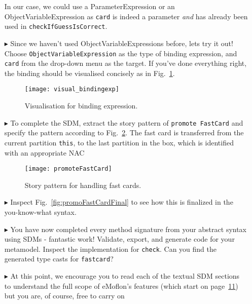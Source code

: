 \begin{itemize}
In our case, we could use a ParameterExpression or an ObjectVariableExpression as \texttt{card} is indeed a parameter \emph{and} has already been used in
\texttt{checkIfGuessIsCorrect}. 

\item[$\blacktriangleright$] Since we haven't used ObjectVariableExpressions before, lets try it out! Choose \texttt{ObjectVariableExpression} as the type of
binding expression, and \texttt{card} from the drop-down menu as the target. If you've done everything right, the binding should be visualised concisely as in
Fig.~\ref{fig:sdm_fastcard_4}.
 
\begin{figure}[htbp]
\begin{center}
  \texttt{[image: visual\_bindingexp]}
  \caption{Visualisation for binding expression.}  
  \label{fig:sdm_fastcard_4}
\end{center}
\end{figure}

\item[$\blacktriangleright$] To complete the SDM, extract the story pattern of \texttt{promote FastCard} and specify the pattern according to
Fig.~\ref{fig:sdm_fastcard_5}.
The fast card is transferred from the current partition \texttt{this}, to the last partition in the box, which is identified with an appropriate \mbox{NAC}

\begin{figure}[htbp]
\begin{center}
  \texttt{[image: promoteFastCard]}
  \caption{Story pattern for handling fast cards.}  
  \label{fig:sdm_fastcard_5}
\end{center}
\end{figure}

\item[$\blacktriangleright$] Inspect Fig.~\ref{fig:promoFastCardFinal} to see how this is finalized in the you-know-what syntax.

\item[$\blacktriangleright$] You have now completed every method signature from your abstract syntax using SDMs - fantastic work! Validate, export, and generate
code for your metamodel. Inspect the implementation for \texttt{check}.  Can you find the generated type casts for \texttt{fastcard}?

\item[$\blacktriangleright$] At this point, we encourage you to read each of the textual SDM sections to understand the full scope of eMoflon's features
(which start on page~\hyperlink{page.11}{11}) but you are, of course, free to carry on
\end{itemize}
